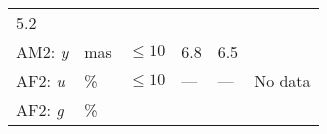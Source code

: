 \documentclass[DM, lsstdraft, toc]{lsstdoc}
\begin{document}
\begin{longtable}[]{@{}llllll@{}}
\begin{minipage}[t]{0.12\columnwidth}
5.2\strut
\end{minipage} & \begin{minipage}[t]{0.17\columnwidth}\raggedright\strut
\strut
\end{minipage}\tabularnewline
\begin{minipage}[t]{0.12\columnwidth}\raggedright\strut
AM2: \emph{y}\strut
\end{minipage} & \begin{minipage}[t]{0.06\columnwidth}\raggedright\strut
mas\strut
\end{minipage} & \begin{minipage}[t]{0.14\columnwidth}\raggedright\strut
\(\leq 10\)\strut
\end{minipage} & \begin{minipage}[t]{0.12\columnwidth}\raggedright\strut
6.8\strut
\end{minipage} & \begin{minipage}[t]{0.12\columnwidth}\raggedright\strut
6.5\strut
\end{minipage} & \begin{minipage}[t]{0.17\columnwidth}\raggedright\strut
\strut
\end{minipage}\tabularnewline
\begin{minipage}[t]{0.12\columnwidth}\raggedright\strut
AF2: \emph{u}\strut
\end{minipage} & \begin{minipage}[t]{0.06\columnwidth}\raggedright\strut
\%\strut
\end{minipage} & \begin{minipage}[t]{0.14\columnwidth}\raggedright\strut
\(\leq 10\)\strut
\end{minipage} & \begin{minipage}[t]{0.12\columnwidth}\raggedright\strut
---\strut
\end{minipage} & \begin{minipage}[t]{0.12\columnwidth}\raggedright\strut
---\strut
\end{minipage} & \begin{minipage}[t]{0.17\columnwidth}\raggedright\strut
No data\strut
\end{minipage}\tabularnewline
\begin{minipage}[t]{0.12\columnwidth}\raggedright\strut
AF2: \emph{g}\strut
\end{minipage} & \begin{minipage}[t]{0.06\columnwidth}\raggedright\strut
\%\strut
\end{minipage} & \begin{minipage}[t]{0.14\columnwidth}\raggedright\strut

\end{minipage}
\end{longtable}
\end{document}
